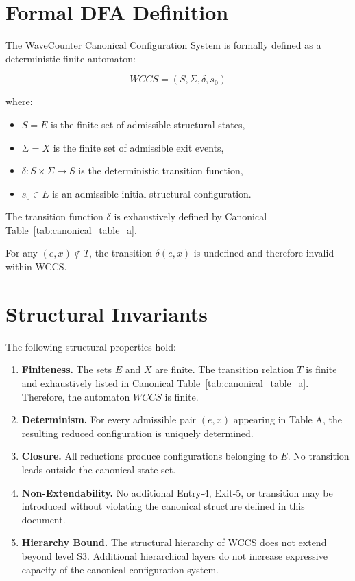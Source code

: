 \documentclass[11pt]{article}
\begin{document}
\section{Formal DFA Definition}
The WaveCounter Canonical Configuration System is formally defined as a deterministic finite automaton:

\[
WCCS = (S, \Sigma, \delta, s_0)
\]

where:

\begin{itemize}
\item $S = E$ is the finite set of admissible structural states,
\item $\Sigma = X$ is the finite set of admissible exit events,
\item $\delta : S \times \Sigma \rightarrow S$ is the deterministic transition function,
\item $s_0 \in E$ is an admissible initial structural configuration.
\end{itemize}

The transition function $\delta$ is exhaustively defined by Canonical Table~\ref{tab:canonical_table_a}.

For any $(e, x) \notin T$, the transition $\delta(e,x)$ is undefined and therefore invalid within WCCS.

\section{Structural Invariants}

The following structural properties hold:

\begin{enumerate}

\item \textbf{Finiteness.}  
The sets $E$ and $X$ are finite.  
The transition relation $T$ is finite and exhaustively listed in Canonical Table~\ref{tab:canonical_table_a}.  
Therefore, the automaton $WCCS$ is finite.

\item \textbf{Determinism.}  
For every admissible pair $(e, x)$ appearing in Table A, the resulting reduced configuration is uniquely determined.

\item \textbf{Closure.}  
All reductions produce configurations belonging to $E$.  
No transition leads outside the canonical state set.

\item \textbf{Non-Extendability.}  
No additional Entry-4, Exit-5, or transition may be introduced without violating the canonical structure defined in this document.

\item \textbf{Hierarchy Bound.}  
The structural hierarchy of WCCS does not extend beyond level S3.  
Additional hierarchical layers do not increase expressive capacity of the canonical configuration system.

\end{enumerate}
\end{document}
